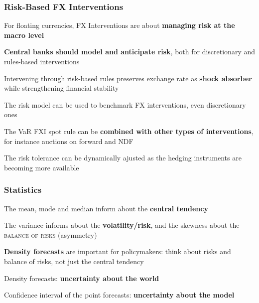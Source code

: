 \documentclass{beamer}
\newenvironment{wideitemize}{\itemize\addtolength{\itemsep}{10pt}}{\enditemize}
\begin{document}
\begin{frame}
  \frametitle{Risk-Based FX Interventions}
  \begin{wideitemize}
   \item For floating currencies, FX Interventions are about \textbf{managing risk at the macro level}
   \item \textbf{Central banks should model and anticipate risk}, both for discretionary and rules-based interventions
    \item Intervening through risk-based rules preserves exchange rate as \textbf{shock absorber} while strengthening financial stability
    \item The risk model can be used to benchmark FX interventions, even discretionary ones
    \item The VaR FXI spot rule can be \textbf{combined with other types of interventions}, for instance auctions on forward and NDF
    \item The risk tolerance can be dynamically ajusted as the hedging instruments are becoming more available  
  \end{wideitemize}
\end{frame}


\begin{frame}
  \frametitle{Statistics}
  \begin{wideitemize}
    \item The mean, mode and median inform about the \textbf{central tendency}
    \item The variance informs about the \textbf{volatility/risk}, and the skewness about the \textsc{balance of risks} (asymmetry)
    \item \textbf{Density forecasts} are important for policymakers: think about risks and balance of risks, not just the central tendency
    \item Density forecasts: \textbf{uncertainty about the world}
    \item Confidence interval of the point forecasts: \textbf{uncertainty about the model}
  \end{wideitemize}

\end{frame}
\end{document}
